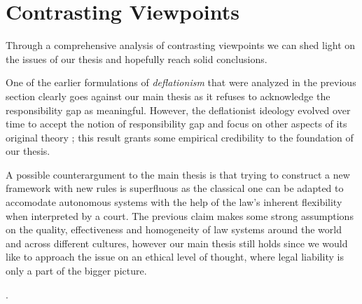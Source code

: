 \section{Contrasting Viewpoints}\label{sec:viewpoints}

Through a comprehensive analysis of contrasting viewpoints we can shed light on the issues of our thesis and hopefully reach solid conclusions.

One of the earlier formulations of \textit{deflationism} \parencite{HAYTMP} that were analyzed in the previous section clearly goes against our main thesis as it refuses to acknowledge the responsibility gap as meaningful.
However, the deflationist ideology evolved over time to accept the notion of responsibility gap and focus on other aspects of its original theory \parencite{SIJWA}; this result grants some empirical credibility to the foundation of our thesis.

A possible counterargument to the main thesis is that trying to construct a new framework with new rules is superfluous as the classical one can be adapted to accomodate autonomous systems with the help of the law's inherent flexibility when interpreted by a court.
The previous claim makes some strong assumptions on the quality, effectiveness and homogeneity of law systems around the world and across different cultures, however our main thesis still holds since we would like to approach the issue on an ethical level of thought, where legal liability is only a part of the bigger picture.

.